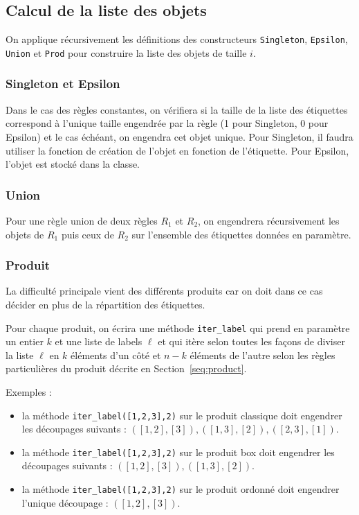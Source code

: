 \documentclass[11pt]{article}
\begin{document}
\subsection{Calcul de la liste des objets}

On applique récursivement les définitions des constructeurs
\texttt{Singleton}, \texttt{Epsilon}, \texttt{Union} et \texttt{Prod} pour
construire la liste des objets de taille $i$. 

\subsubsection{Singleton et Epsilon}

Dans le cas des règles constantes, on vérifiera si la taille de la liste
des étiquettes
correspond à l'unique taille engendrée par la règle (1 pour Singleton, 0
pour Epsilon) et le cas échéant, on engendra cet objet unique. Pour Singleton,
il faudra utiliser la fonction de création de l'objet en fonction de l'étiquette.
Pour Epsilon, l'objet est stocké dans la classe.

\subsubsection{Union}

Pour une règle union de deux règles $R_1$ et $R_2$, on engendrera récursivement
les objets de $R_1$ puis ceux de $R_2$ sur l'ensemble des étiquettes données
en paramètre.

\subsubsection{Produit}

La difficulté principale 
vient des différents produits car on doit dans ce cas décider en plus de
la répartition des étiquettes. 

Pour chaque produit, on écrira une méthode {\tt iter\_label} qui prend 
en paramètre un entier $k$ et une liste de labels $\ell$ et qui itère
selon toutes les façons de diviser la liste $\ell$ en $k$ éléments d'un côté et $n-k$ éléments de 
l'autre selon les règles particulières du produit décrite en Section~\ref{seq:product}.

Exemples :
\begin{itemize}
\item la méthode \texttt{iter\_label([1,2,3],2)} sur le produit classique doit engendrer les 
découpages suivants : $([1,2], [3]), ([1,3], [2]), ([2,3], [1])$.
\item la méthode \texttt{iter\_label([1,2,3],2)} sur le produit box doit engendrer les 
découpages suivants : $([1,2], [3]), ([1,3], [2])$.
\item la méthode \texttt{iter\_label([1,2,3],2)} sur le produit ordonné doit engendrer l'unique
découpage : $([1,2], [3])$.
\end{itemize}
\end{document}
